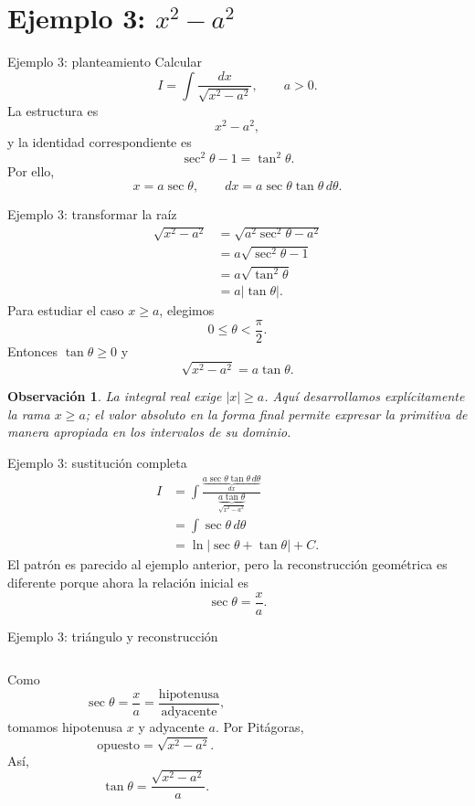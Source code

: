 \documentclass[10pt,aspectratio=169]{beamer}
\newtheorem{observacion}{Observación}
\begin{document}
\section{Ejemplo 3: $x^2-a^2$}
\begin{frame}{Ejemplo 3: planteamiento}
Calcular
\[
\boxed{I=\int\frac{dx}{\sqrt{x^2-a^2}}},\qquad a>0.
\]
La estructura es
\[
x^2-a^2,
\]
y la identidad correspondiente es
\[
\sec^2\theta-1=\tan^2\theta.
\]
Por ello,
\[
\boxed{x=a\sec\theta},\qquad
\boxed{dx=a\sec\theta\tan\theta\,d\theta}.
\]
\end{frame}

\begin{frame}{Ejemplo 3: transformar la raíz}
\begin{align*}
\sqrt{x^2-a^2}
&=\sqrt{a^2\sec^2\theta-a^2}\\
&=a\sqrt{\sec^2\theta-1}\\
&=a\sqrt{\tan^2\theta}\\
&=a|\tan\theta|.
\end{align*}
Para estudiar el caso $x\ge a$, elegimos
\[
0\le\theta<\frac{\pi}{2}.
\]
Entonces $\tan\theta\ge0$ y
\[
\boxed{\sqrt{x^2-a^2}=a\tan\theta}.
\]
\begin{observacion}
La integral real exige $|x|\ge a$. Aquí desarrollamos explícitamente la rama $x\ge a$; el valor absoluto en la forma final permite expresar la primitiva de manera apropiada en los intervalos de su dominio.
\end{observacion}
\end{frame}

\begin{frame}{Ejemplo 3: sustitución completa}
\begin{align*}
I
&=\int
\frac{\underbrace{a\sec\theta\tan\theta\,d\theta}_{dx}}
{\underbrace{a\tan\theta}_{\sqrt{x^2-a^2}}}\\
&=\int\sec\theta\,d\theta\\
&=\ln|\sec\theta+\tan\theta|+C.
\end{align*}
El patrón es parecido al ejemplo anterior, pero la reconstrucción geométrica es diferente porque ahora la relación inicial es
\[
\sec\theta=\frac{x}{a}.
\]
\end{frame}

\begin{frame}{Ejemplo 3: triángulo y reconstrucción}
\begin{columns}[T]
Como
\[
\sec\theta=\frac{x}{a}
=\frac{\text{hipotenusa}}{\text{adyacente}},
\]
tomamos hipotenusa $x$ y adyacente $a$. Por Pitágoras,
\[
\text{opuesto}=\sqrt{x^2-a^2}.
\]
Así,
\[
\tan\theta=\frac{\sqrt{x^2-a^2}}{a}.
\]
\centering
{}
\end{columns}
\end{frame}
\end{document}
